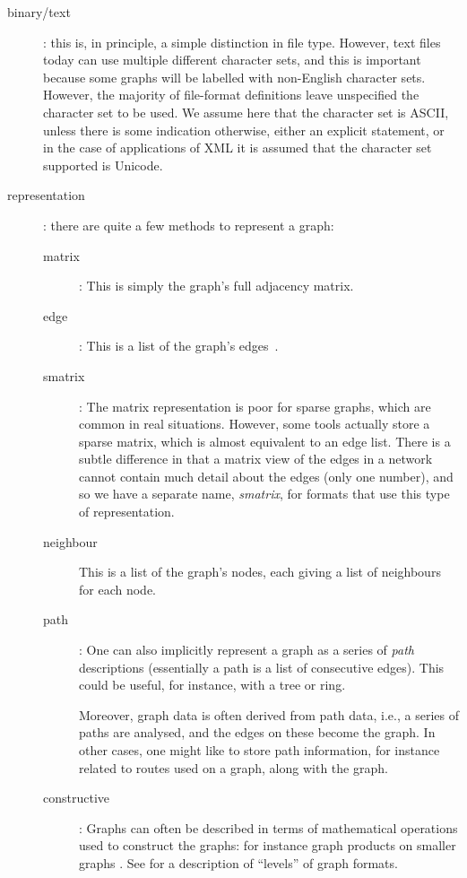 \documentclass{sig-alternate}
\begin{document}
\begin{description}
\item[binary/text]: this is, in principle, a simple distinction in
  file type. However, text files today can use multiple different
  character sets, and this is important because some graphs will be
  labelled with non-English character sets. However, the majority of
  file-format definitions leave unspecified the character set to be
  used. We assume here that the character set is ASCII, unless there
  is some indication otherwise, either an explicit statement, or in
  the case of applications of XML it is assumed that the character set
  supported is Unicode.

\item[representation]: there are quite a few methods to
  represent a graph: 
  \begin{description}
  \item[matrix]: This is simply the graph's full adjacency matrix.

  \item[edge]: This is a list of the graph's edges~\cite{ebert87:_versat_data}.

  \item[smatrix]: The matrix representation is poor for sparse graphs,
    which are common in real situations. However, some tools actually
    store a sparse matrix, which is almost equivalent to an edge
    list. There is a subtle difference in that a matrix view of the
    edges in a network cannot contain much detail about the edges
    (only one number), and so we have a separate name, {\em smatrix},
    for formats that use this type of representation.

  \item[neighbour] This is a list of the graph's nodes, each giving a
    list of neighbours for each node.

  \item[path]: One can also implicitly represent a graph as a series
    of {\em path} descriptions (essentially a path is a list of
    consecutive edges). This could be useful, for instance, with a
    tree or ring. 

    Moreover, graph data is often derived from path data, i.e., a
    series of paths are analysed, and the edges on these become the
    graph. In other cases, one might like to store path information,
    for instance related to routes used on a graph, along with the
    graph.

  \item[constructive]: Graphs can often be described in terms of
    mathematical operations used to construct the graphs: for instance
    graph products on smaller graphs
    \cite{parsonage11:_gener_graph_produc_networ_desig_analy}. See
    \cite{batagelj95:_towar_netml} for a description of ``levels'' of
    graph formats.


\end{description}
\end{description}
\end{document}
